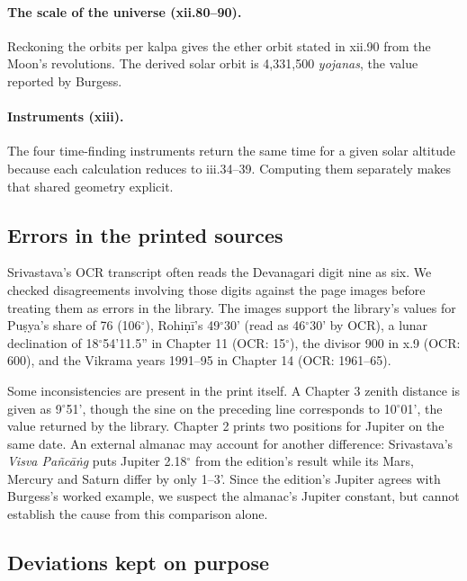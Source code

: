 \documentclass[11pt,a4paper]{article}
\begin{document}
\paragraph{The scale of the universe (xii.80--90).} Reckoning the orbits per kalpa gives the ether orbit stated in xii.90 from the Moon's revolutions. The derived solar orbit is 4,331,500 \textit{yojanas}, the value reported by Burgess.

\paragraph{Instruments (xiii).} The four time-finding instruments return the same time for a given solar altitude because each calculation reduces to iii.34--39. Computing them separately makes that shared geometry explicit.

\subsection{Errors in the printed sources}
\label{sec:book-errors}

Srivastava's OCR transcript often reads the Devanagari digit nine as six. We checked disagreements involving those digits against the page images before treating them as errors in the library. The images support the library's values for Pu\d{s}ya's share of 76 (106$^\circ$), Rohi\d{n}\={i}'s 49$^\circ$30' (read as 46$^\circ$30' by OCR), a lunar declination of 18$^\circ$54'11.5'' in Chapter 11 (OCR: 15$^\circ$), the divisor 900 in x.9 (OCR: 600), and the Vikrama years 1991--95 in Chapter 14 (OCR: 1961--65).

Some inconsistencies are present in the print itself. A Chapter 3 zenith distance is given as 9$^\circ$51', though the sine on the preceding line corresponds to 10$^\circ$01', the value returned by the library. Chapter 2 prints two positions for Jupiter on the same date. An external almanac may account for another difference: Srivastava's \textit{Visva Pa\~{n}c\={a}\.{n}g} puts Jupiter 2.18$^\circ$ from the edition's result while its Mars, Mercury and Saturn differ by only 1--3'. Since the edition's Jupiter agrees with Burgess's worked example, we suspect the almanac's Jupiter constant, but cannot establish the cause from this comparison alone.

\subsection{Deviations kept on purpose}
\label{sec:deviations}
\end{document}
